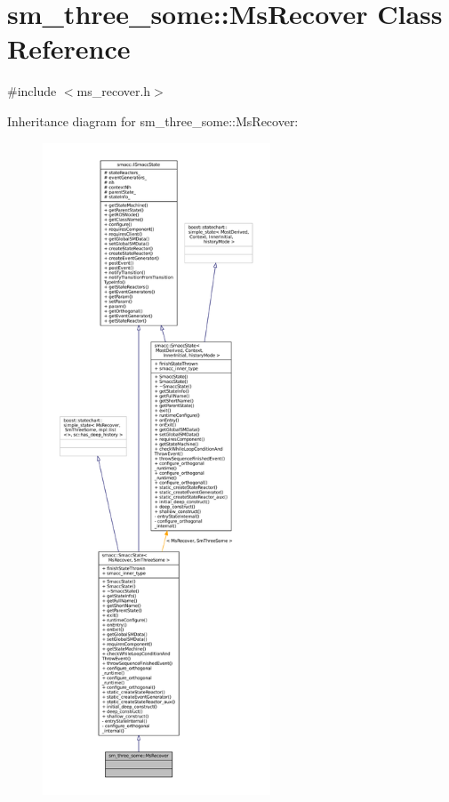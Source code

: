 \hypertarget{classsm__three__some_1_1MsRecover}{}\section{sm\+\_\+three\+\_\+some\+:\+:Ms\+Recover Class Reference}
\label{classsm__three__some_1_1MsRecover}


{\ttfamily \#include $<$ms\+\_\+recover.\+h$>$}



Inheritance diagram for sm\+\_\+three\+\_\+some\+:\+:Ms\+Recover\+:
\nopagebreak
\begin{figure}[H]
\begin{center}
\leavevmode
\includegraphics[height=550pt]{classsm__three__some_1_1MsRecover__inherit__graph}
\end{center}
\end{figure}



